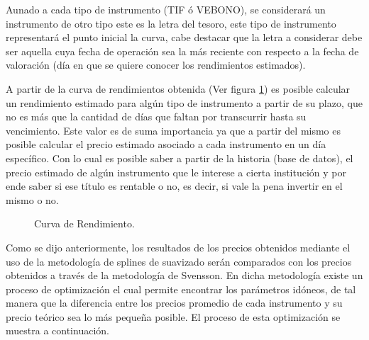 \hspace{0.4cm} Aunado a cada tipo de instrumento (TIF \'o VEBONO), se considerar\'a un instrumento de otro tipo este es la letra del tesoro, este tipo de instrumento representar\'a el punto inicial la curva, cabe destacar que la letra a considerar debe ser aquella cuya fecha de operaci\'on sea la m\'as reciente con respecto a la fecha de valoraci\'on (d\'ia en que se quiere conocer los rendimientos estimados).


\hspace{0.4cm} A partir de la curva de rendimientos obtenida (Ver figura \ref{c_rend}) es posible calcular un rendimiento estimado para alg\'un tipo de instrumento a partir de su plazo, que no es m\'as que la cantidad de d\'ias que faltan por transcurrir hasta su vencimiento. Este valor es de suma importancia ya que a partir del mismo es posible calcular el precio estimado asociado a cada instrumento en un d\'ia espec\'ifico. Con lo cual es posible saber a partir de la historia (base de datos), el precio estimado de alg\'un instrumento que le interese a cierta instituci\'on y por ende saber si ese t\'itulo es rentable o no, es decir, si vale la pena invertir en el mismo o no.

\begin{figure}[h]
\caption{Curva de Rendimiento.}
\label{c_rend}
\end{figure}

\hspace{0.4cm} Como se dijo anteriormente, los resultados de los precios obtenidos mediante el uso de la metodolog\'ia de splines de suavizado ser\'an comparados con los precios obtenidos a trav\'es de la metodolog\'ia de Svensson. En dicha metodolog\'ia existe un proceso de optimizaci\'on el cual permite encontrar los par\'ametros id\'oneos, de tal manera que la diferencia entre los precios promedio de cada instrumento y su precio te\'orico sea lo m\'as peque\~na posible. El proceso de esta optimizaci\'on se muestra a continuaci\'on.


